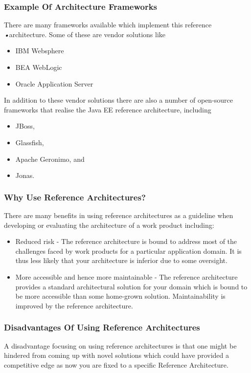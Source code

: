 \documentclass[a4paper]{article}
\begin{document}
\subsubsection{Example Of Architecture Frameworks}
There are many frameworks available which implement this reference \textsl{\textsl{•}}architecture. Some of these are vendor solutions like
\begin{itemize}
\item IBM Websphere
\item BEA WebLogic
\item Oracle Application Server
\end{itemize} 
In addition to these vendor solutions there are also a number of open-source frameworks that realise the Java EE reference architecture, including
\begin{itemize}
\item JBoss,
\item Glassfish,
\item Apache Geronimo, and
\item Jonas.
\end{itemize}
\subsubsection{Why Use Reference Architectures?}
There are many benefits in using reference architectures as a guideline when developing or evaluating the architecture of a work product including:
\begin{itemize}
\item Reduced risk - The reference architecture is bound to address most of the challenges faced by work products for a particular application domain. It is thus less likely that your architecture is inferior due to some oversight.
\item More accessible and hence more maintainable - The reference architecture provides a standard architectural solution for your domain which is bound to be more accessible than some home-grown solution. Maintainability is improved by the reference architecture.
\end{itemize}
\subsubsection{Disadvantages Of Using Reference Architectures}
A disadvantage focusing on using reference architectures is that one might be hindered from coming up with novel solutions which could have provided a competitive edge as now you are fixed to a specific Reference Architecture.
\end{document}
